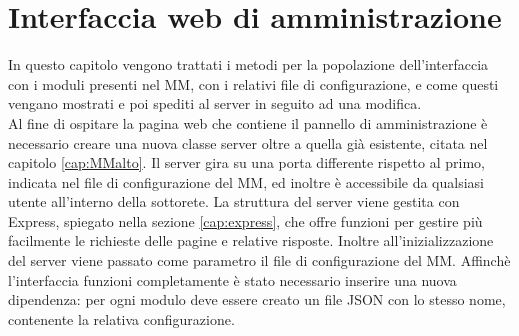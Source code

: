 \chapter{Interfaccia web di amministrazione}\label{capitolo5}
In questo capitolo vengono trattati i metodi per la popolazione dell'interfaccia con i moduli
presenti nel MM, con i relativi file di configurazione, e come questi vengano mostrati e poi spediti
al server in seguito ad una modifica.\\[1\baselineskip]
Al fine di ospitare la pagina web che contiene il pannello di amministrazione è necessario
creare una nuova classe server oltre a quella già esistente, citata nel capitolo \ref{cap:MMalto}.
Il server gira su una porta differente rispetto al primo, indicata nel file di configurazione del MM,
ed inoltre è accessibile da qualsiasi utente all'interno della sottorete.
La struttura del server viene gestita con Express, spiegato nella sezione \ref{cap:express}, che offre funzioni per gestire
più facilmente le richieste delle pagine e relative risposte.
Inoltre all'inizializzazione del server viene passato come parametro il file di configurazione del
MM.
Affinchè l'interfaccia funzioni completamente è stato necessario inserire una nuova dipendenza:
per ogni modulo deve essere creato un file JSON con lo stesso nome,
contenente la relativa configurazione.

